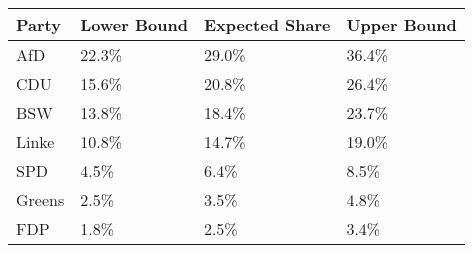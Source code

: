 \begin{tabular}{llll}
  \hline
Party & Lower Bound & Expected Share & Upper Bound \\ 
  \hline
AfD & 22.3\% & 29.0\% & 36.4\% \\ 
  CDU & 15.6\% & 20.8\% & 26.4\% \\ 
  BSW & 13.8\% & 18.4\% & 23.7\% \\ 
  Linke & 10.8\% & 14.7\% & 19.0\% \\ 
  SPD & 4.5\% & 6.4\% & 8.5\% \\ 
  Greens & 2.5\% & 3.5\% & 4.8\% \\ 
  FDP & 1.8\% & 2.5\% & 3.4\% \\ 
   \hline
\end{tabular}
